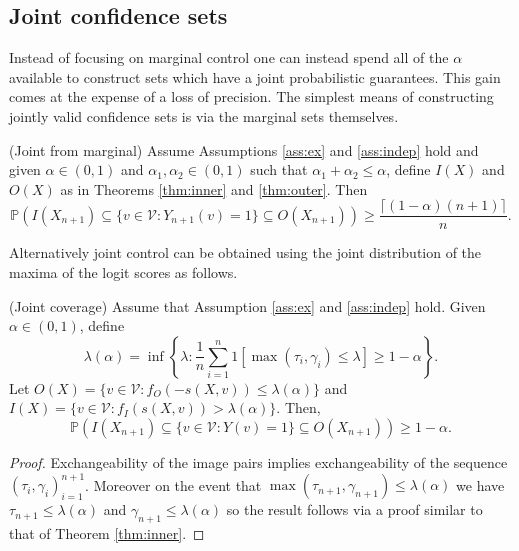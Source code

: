 \subsection{Joint confidence sets}\label{SS:joint}
Instead of focusing on marginal control one can instead spend all of the $\alpha$ available to construct sets which have a joint probabilistic guarantees. This gain comes at the expense of a loss of precision. The simplest means of constructing jointly valid confidence sets is via the marginal sets themselves.
\begin{corollary}\label{cor:weighting}
	(Joint from marginal) Assume Assumptions \ref{ass:ex} and \ref{ass:indep} hold and given $\alpha \in (0,1)$ and $\alpha_1, \alpha_2 \in (0,1)$ such that $\alpha_1 + \alpha_2 \leq \alpha$, define $I(X)$ and  $O(X)$ as in Theorems \ref{thm:inner} and \ref{thm:outer}. Then 
	\begin{equation}
		\mathbb{P}\left( I(X_{n+1}) \subseteq \lbrace v\in \mathcal{V}: Y_{n+1}(v) = 1 \rbrace \subseteq O(X_{n+1})  \right) \geq  \frac{\lceil (1-\alpha)(n+1) \rceil}{n}. 
	\end{equation}
\end{corollary}
Alternatively joint control can be obtained using the joint distribution of the maxima of the logit scores as follows.
\begin{theorem}\label{thm:joint}
	(Joint coverage) Assume that Assumption \ref{ass:ex} and \ref{ass:indep}  hold. Given $\alpha \in (0,1)$, define 
	\begin{equation*}
		\lambda(\alpha) = \inf\left\lbrace \lambda: \frac{1}{n} \sum_{i = 1}^n 1\left[ \max(\tau_i, \gamma_i) \leq \lambda \right] \geq 1-\alpha \right\rbrace.
	\end{equation*}
 Let $O(X) = \lbrace v \in \mathcal{V}: f_O(-s(X,v)) \leq \lambda(\alpha) \rbrace $ and $I(X) = \lbrace v \in \mathcal{V}: f_I(s(X,v)) >	\lambda(\alpha) \rbrace $. Then,
\begin{equation}\label{eq:probstat}
	\mathbb{P}\left( I(X_{n+1}) \subseteq \lbrace v\in \mathcal{V}: Y(v) = 1 \rbrace \subseteq O(X_{n+1}) \right) \geq 1 - \alpha.
\end{equation}
\end{theorem}
\begin{proof}
	Exchangeability of the image pairs implies exchangeability of the sequence $(\tau_i, \gamma_i)_{i = 1}^{n+1}$. Moreover on the event that $\max(\tau_{n+1}, \gamma_{n+1}) \leq \lambda(\alpha)$ we have $\tau_{n+1} \leq \lambda(\alpha)$ and $\gamma_{n+1} \leq \lambda(\alpha)$ so the result follows via a proof similar to that of Theorem \ref{thm:inner}.
\end{proof}

